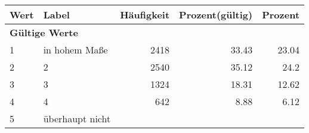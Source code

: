      \begin{longtable}{lXrrr}
     \toprule
     \textbf{Wert} & \textbf{Label} & \textbf{Häufigkeit} & \textbf{Prozent(gültig)} & \textbf{Prozent} \\
     \endhead
     \midrule
     \multicolumn{5}{l}{\textbf{Gültige Werte}}\\

     1 &
     \multicolumn{1}{X}{ in hohem Maße   } &


       \num{2418} &
       \num[round-mode=places,round-precision=2]{33,43} &
         \num[round-mode=places,round-precision=2]{23,04} \\

     2 &
     \multicolumn{1}{X}{ 2   } &


       \num{2540} &
       \num[round-mode=places,round-precision=2]{35,12} &
         \num[round-mode=places,round-precision=2]{24,2} \\

     3 &
     \multicolumn{1}{X}{ 3   } &


       \num{1324} &
       \num[round-mode=places,round-precision=2]{18,31} &
         \num[round-mode=places,round-precision=2]{12,62} \\

     4 &
     \multicolumn{1}{X}{ 4   } &


       \num{642} &
       \num[round-mode=places,round-precision=2]{8,88} &
         \num[round-mode=places,round-precision=2]{6,12} \\

     5 &
     \multicolumn{1}{X}{ überhaupt nicht   } &



\end{longtable}
